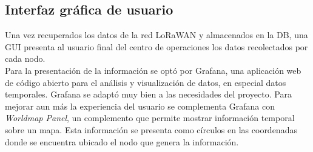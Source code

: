 \subsection{Interfaz gráfica de usuario}
Una vez recuperados los datos de la red LoRaWAN y almacenados en la DB, una GUI presenta al usuario final del centro de operaciones los datos recolectados por cada nodo.\\
Para la presentación de la información se optó por Grafana, una aplicación web de código abierto para el análisis y visualización de datos, en especial datos temporales.
Grafana se adaptó muy bien a las necesidades del proyecto. Para mejorar aun más la experiencia del usuario se complementa Grafana con \textit{Worldmap Panel}, un complemento que permite mostrar información temporal sobre un mapa. Esta información se presenta como círculos en las coordenadas donde se encuentra ubicado el nodo que genera la información.
